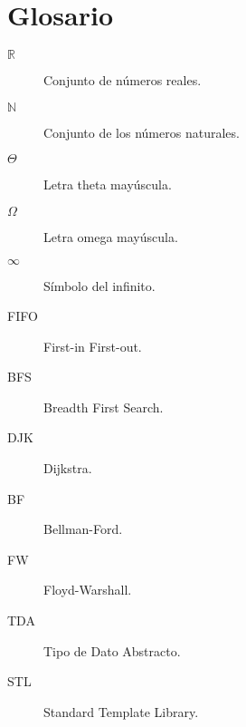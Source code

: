 
\chapter*{Glosario}

\begin{description} 
 	\item[$\mathbb{R}$] Conjunto de números reales.
 	
 	\item[$\mathbb{N}$] Conjunto de los números naturales.
 	
 	\item[$\Theta$] Letra theta mayúscula.
 	
 	\item[$\Omega$]Letra omega mayúscula.

	\item[$\infty$] Símbolo del infinito.
	
	\item[FIFO] First-in First-out.
	
	\item[BFS] Breadth First Search.
	
	\item[DJK] Dijkstra.
	
	\item[BF] Bellman-Ford.
	
	\item[FW] Floyd-Warshall.
	
	\item[TDA] Tipo de Dato Abstracto.
	
	\item[STL] Standard Template Library.
\end{description}
\endinput
